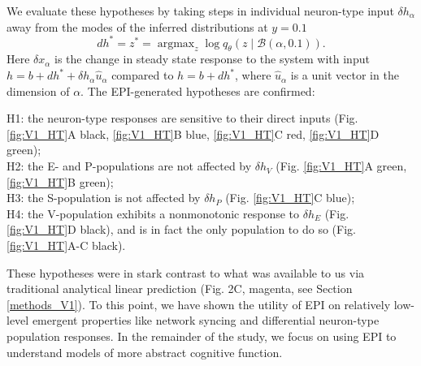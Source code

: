 \documentclass[11pt]{article}
\DeclareMathOperator*{\argmax}{argmax}
\begin{document}
We evaluate these hypotheses by taking steps in individual neuron-type input $\delta h_\alpha$ away from the modes of the inferred distributions at $y=0.1$
\begin{equation}
dh^* = z^* = \argmax_{z} \log q_\theta(z \mid \mathcal{B}(\alpha, 0.1)).
\end{equation}
Here $\delta x_{\alpha}$ is the change in steady state response to the system with input $h = b + dh^* + \delta h_\alpha \hat{u}_\alpha$ compared to $h = b + dh^*$, where $\hat{u}_\alpha$ is a unit vector in the dimension of $\alpha$. The EPI-generated  hypotheses are confirmed: 

{\addtolength{\leftskip}{10 mm}
H1: the neuron-type responses are sensitive to their direct inputs (Fig. \ref{fig:V1_HT}A black, \ref{fig:V1_HT}B blue, \ref{fig:V1_HT}C red, \ref{fig:V1_HT}D green); \\
H2: the E- and P-populations are not affected by $\delta h_V$ (Fig. \ref{fig:V1_HT}A green, \ref{fig:V1_HT}B green); \\
H3: the S-population is not affected by $\delta h_P$ (Fig. \ref{fig:V1_HT}C blue); \\
H4: the V-population exhibits a nonmonotonic response to $\delta h_E$ (Fig. \ref{fig:V1_HT}D black), and is in fact the only population to do so (Fig. \ref{fig:V1_HT}A-C black).

}

These hypotheses were in stark contrast to what was available to us via traditional analytical linear prediction (Fig. 2C, magenta, see Section \ref{methods_V1}).
To this point, we have shown the utility of EPI on relatively low-level emergent properties like network syncing and differential neuron-type population responses.  
In the remainder of the study, we focus on using EPI to understand models of more abstract cognitive function.

\end{document}
